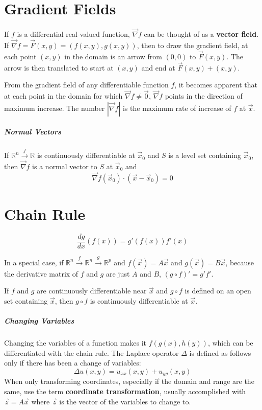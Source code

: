 \documentclass[11pt]{article}
\begin{document}
\section{Gradient Fields}
	If $f$ is a differential real-valued function, $\vec{\nabla} f$ can be thought of as a \textbf{vector field}. If $\vec{\nabla} f = \vec{F}(x, y) = (f(x, y), g(x, y))$, then to draw the gradient field, at each point $(x, y)$ in the domain is an arrow from $(0,0)$ to $\vec{F}(x, y)$. The arrow is then translated to start at $(x, y)$ and end at $\vec{F}(x, y) + (x, y)$.
	
	From the gradient field of any differentiable function $f$, it becomes apparent that at each point in the domain for which $\vec{\nabla} f \neq \vec{0}$, $\vec{\nabla} f$ points in the direction of maximum increase. The number $|\vec{\nabla} f|$ is the maximum rate of increase of $f$ at $\vec{x}$.
	
	\subparagraph{Normal Vectors} If $\mathbb{R}^n \xrightarrow{f} \mathbb{R}$ is continuously differentiable at $\vec{x}_0$ and $S$ is a level set containing $\vec{x}_0$, then $\vec{\nabla}f$ is a normal vector to $S$ at $\vec{x}_0$ and
	\begin{equation}
		\vec{\nabla}f(\vec{x}_0) \cdot (\vec{x}-\vec{x}_0) = 0
	\end{equation}
	
\section{Chain Rule}
	\begin{equation}
		\frac{dg}{dx} (f(x)) = g'(f(x))f'(x)
	\end{equation}
	
	In a special case, if $\mathbb{R}^n \xrightarrow{f} \mathbb{R}^n \xrightarrow{g} \mathbb{R}^p$ and $f(\vec{x}) = A\vec{x}$ and $g(\vec{x}) = B\vec{x}$, because the derivative matrix of $f$ and $g$ are just $A$ and $B$, $(g\circ f)'= g'f'$.
	
	If $f$ and $g$ are continuously differentiable near $\vec{x}$ and $g\circ f$ is defined on an open set containing $\vec{x}$, then $g\circ f$ is continuously differentiable at $\vec{x}$.
	
	\subparagraph{Changing Variables} Changing the variables of a function makes it $f(g(x), h(y))$, which can be differentiated with the chain rule. The Laplace operator $\Delta$ is defined as follows only if there has been a change of variables: 
	\[\Delta u(x, y) = u_{xx}(x, y) + u_{yy}(x, y)\]
	When only transforming coordinates, especially if the domain and range are the same, use the term \textbf{coordinate transformation}, usually accomplished with $\vec{z} = A\vec{x}$ where $\vec{z}$ is the vector of the variables to change to.
	
\end{document}
